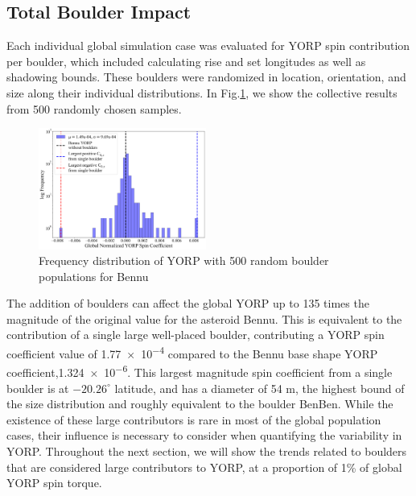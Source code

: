 \subsection{Total Boulder Impact}
Each individual global simulation case was evaluated for YORP spin contribution per boulder, which included calculating rise and set longitudes as well as shadowing bounds. These boulders were randomized in location, orientation, and size along their individual distributions. In Fig.\ref{fig:cases_w_boulders}, we show the collective results from 500 randomly chosen samples.
\begin{figure}[H]
    \centering
    \includegraphics[width=0.49\textwidth]{fig/bennu_comparison.png}
    \caption{Frequency distribution of YORP with 500 random boulder populations for Bennu}
    \label{fig:cases_w_boulders}
\end{figure}

The addition of boulders can affect the global YORP up to 135 times the magnitude of the original value for the asteroid Bennu. This is equivalent to the contribution of a single large well-placed boulder, contributing a YORP spin coefficient value of \num{1.77e-4} compared to the Bennu base shape YORP coefficient,\num{1.324e-6}. This largest magnitude spin coefficient from a single boulder is at $-20.26^{\circ}$ latitude, and has a diameter of 54 m, the highest bound of the size distribution and roughly equivalent to the boulder BenBen. While the existence of these large contributors is rare in most of the global population cases, their influence is necessary to consider when quantifying the variability in YORP. Throughout the next section, we will show the trends related to boulders that are considered large contributors to YORP, at a proportion of 1\% of global YORP spin torque. 

